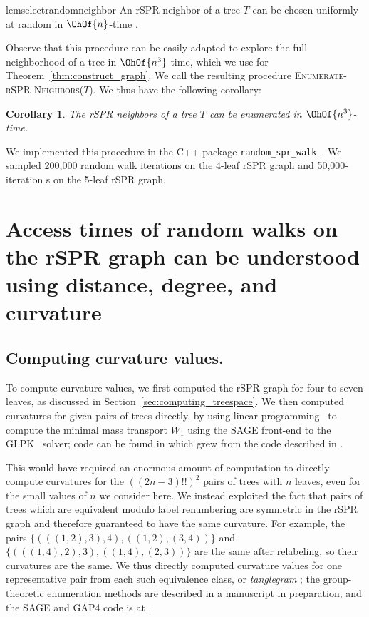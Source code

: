 \documentclass[10pt,twoside,leqno,twocolumn]{article}
\newtheorem{cor}[thm]{Corollary}
\newcommand{\cuttable}[2][]{%
    \ifthenelse{\equal{#1}{}}%
		{}%
		{#1}%
}
\begin{document}
\begin{restatable}{lem}{selectrandomneighbor}
	\label{lem:select_random_neighbor}
	An rSPR neighbor of a tree $T$ can be chosen uniformly at random in $\OhOf{n}$-time\cuttable{ using $\OhOf{n}$ space}.
\end{restatable}

Observe that this procedure can be easily adapted to explore the full neighborhood of a tree in $\OhOf{n^3}$ time, which we use for Theorem~\ref{thm:construct_graph}. We call the resulting procedure \textsc{Enumerate-rSPR-Neighbors($T$)}.
We thus have the following corollary:

\begin{cor}
\label{cor:enumerate_neighbors}
	The rSPR neighbors of a tree $T$ can be enumerated in $\OhOf{n^3}$-time.
\end{cor}

We implemented this procedure in the C++ package \texttt{random\_spr\_walk}~\cite{random_spr_walk}.
We sampled \cuttable{a }200,000\cuttable{-iteration} random walk\cuttable[ iterations]{} on the 4-leaf rSPR graph and \cuttable{a }50,000-iteration\cuttable[s]{ random walk} on the 5-leaf rSPR graph.

\section{Access times of random walks on the rSPR graph can be understood using distance, degree, and curvature}

\subsection{Computing curvature values.}
To compute curvature values, we first \cuttable[computed]{used \texttt{dense\_spr\_graph} to compute} the rSPR graph for four to seven leaves, as discussed in Section~\ref{sec:computing_treespace}.
We then computed curvatures for given pairs of trees directly, by using linear programming~\cite{Loisel2014-hu} to compute the minimal mass transport $W_1$ using the SAGE \cite{SAGE} front-end to the GLPK~\cite{glpk} solver; code can be found in \cite{gricci} which grew from the code described in \cite{Loisel2014-hu}.

This would have required an enormous amount of computation to directly compute curvatures for the $((2n-3)!!)^2$ pairs of trees with $n$ leaves, even for the small values of $n$ we consider here.
We instead exploited the fact that pairs of trees which are equivalent modulo label renumbering are symmetric in the rSPR graph and therefore guaranteed to have the same curvature.
For example, the pairs
$\{(((1,2),3),4), ((1,2),(3,4))\}$ and
$\{(((1,4),2),3), ((1,4),(2,3))\}$
are the same after relabeling, so their curvatures are the same.
We thus directly computed curvature values for one representative pair from each such equivalence class, or \emph{tanglegram} \cite{Venkatachalam2010-zh}; the group-theoretic enumeration methods are described in a manuscript in preparation, and the SAGE \cite{SAGE} and GAP4 \cite{GAP4} code is at \cite{tangle}.
\end{document}
